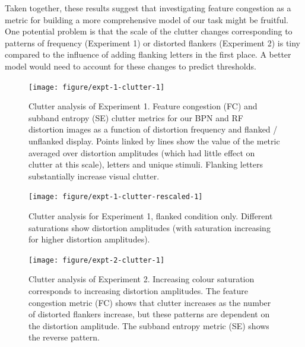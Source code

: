 \documentclass[doc, 11pt,a4paper,natbib]{apa6}\usepackage[]{graphicx}\usepackage[]{color}
\newenvironment{knitrout}{}{} %
\begin{document}
Taken together, these results suggest that investigating feature congestion as a metric for building a more comprehensive model of our task might be fruitful.
One potential problem is that the scale of the clutter changes corresponding to patterns of frequency (Experiment 1) or distorted flankers (Experiment 2) is tiny compared to the influence of adding flanking letters in the first place.
A better model would need to account for these changes to predict thresholds.



\begin{knitrout}
\color{fgcolor}\begin{figure}
\texttt{[image: figure/expt-1-clutter-1]} \caption[Clutter analysis of Experiment 1]{Clutter analysis of Experiment 1.
            Feature congestion (FC) and subband entropy (SE) clutter metrics for our BPN and RF distortion
images as a function of distortion frequency and flanked / unflanked display.
Points linked by lines show the value of the metric averaged over distortion amplitudes (which had little effect on
clutter at this scale), letters and unique stimuli.
Flanking letters substantially increase visual clutter.
              }\label{fig:expt-1-clutter}
\end{figure}


\end{knitrout}




\begin{knitrout}
\color{fgcolor}\begin{figure}
\texttt{[image: figure/expt-1-clutter-rescaled-1]} \caption[Clutter analysis for Experiment 1, flanked condition only]{Clutter analysis for Experiment 1, flanked condition only.
Different saturations show distortion amplitudes (with saturation increasing for higher
distortion amplitudes).
              }\label{fig:expt-1-clutter-rescaled}
\end{figure}


\end{knitrout}




\begin{knitrout}
\color{fgcolor}\begin{figure}
\texttt{[image: figure/expt-2-clutter-1]} \caption[Clutter analysis of Experiment 2]{Clutter analysis of Experiment 2.
Increasing colour saturation corresponds to increasing distortion amplitudes.
The feature congestion metric (FC) shows that clutter increases as the number of distorted flankers increase,
but these patterns are dependent on the distortion amplitude.
The subband entropy metric (SE) shows the reverse pattern.
}\label{fig:expt-2-clutter}
\end{figure}


\end{knitrout}
\end{document}
